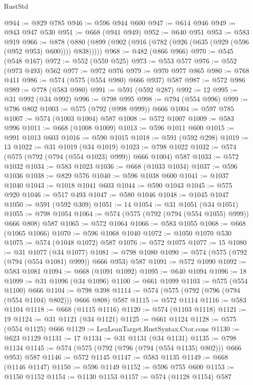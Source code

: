 \begin{lexlean}{RustStd}
\begin{coremodule}
@944 := @829 @785
@946 := @596 @944 @600
@947 := @614 @946
@949 := @943 @947 @530
@951 := @668 (@941 @949)
@952 := @640 @951
@953 := @583 @919
@966 := @878 (@880 (@899 (@902 (@916 (@782 (@926 (@635 (@929 (@596 (@952 @953) @600)))) @838)))))
@968 := @482 (@866 @966)
@970 := @545 (@548 @167)
@972 := @552 (@559 @525)
@973 := @553 @577
@976 := @552 (@973 @493) @562
@977 := @972 @976
@979 := @970 @977 @865
@980 := @768 @411
@986 := @574 (@575 (@554 @980) @666 @937) @587
@987 := @572 @986
@989 := @778 (@583 @980)
@991 := @591 (@592 @287)
@992 := 12
@995 := @31 @992 (@34 @992)
@996 := @798 @995
@998 := @794 (@554 @996)
@999 := @796 @802
@1003 := @575 (@792 (@998 @999)) @666
@1004 := @597 @785
@1007 := @574 (@1003 @1004) @587
@1008 := @572 @1007
@1009 := @583 @996
@1011 := @668 (@1008 @1009)
@1013 := @596 @1011 @600
@1015 := @991 @1013 @603
@1016 := @590 @1015
@1018 := @591 (@592 @298)
@1019 := 13
@1022 := @31 @1019 (@34 @1019)
@1023 := @798 @1022
@1032 := @574 (@575 (@792 (@794 (@554 @1023) @999)) @666 @1004) @587
@1033 := @572 @1032
@1034 := @583 @1023
@1036 := @668 (@1033 @1034)
@1037 := @596 @1036
@1038 := @829 @576
@1040 := @596 @1038 @600
@1041 := @1037 @1040
@1043 := @1018 @1041 @603
@1044 := @590 @1043
@1045 := @575 @920
@1046 := @517 @493
@1047 := @580 @1046
@1048 := @1045 @1047
@1050 := @591 (@592 @309)
@1051 := 14
@1054 := @31 @1051 (@34 @1051)
@1055 := @798 @1054
@1064 := @574 (@575 (@792 (@794 (@554 @1055) @999)) @666 @808) @587
@1065 := @572 @1064
@1066 := @583 @1055
@1068 := @668 (@1065 @1066)
@1070 := @596 @1068 @1040
@1072 := @1050 @1070 @530
@1075 := @574 (@1048 @1072) @587
@1076 := @572 @1075
@1077 := 15
@1080 := @31 @1077 (@34 @1077)
@1081 := @798 @1080
@1090 := @574 (@575 (@792 (@794 (@554 @1081) @999)) @666 @953) @587
@1091 := @572 @1090
@1092 := @583 @1081
@1094 := @668 (@1091 @1092)
@1095 := @640 @1094
@1096 := 18
@1099 := @31 @1096 (@34 @1096)
@1100 := @661 @1099
@1103 := @575 (@554 @1100) @666
@1104 := @798 @398
@1114 := @574 (@575 (@792 (@796 (@794 (@554 @1104) @802))) @666 @808) @587
@1115 := @572 @1114
@1116 := @583 @1104
@1118 := @668 (@1115 @1116)
@1120 := @574 (@1103 @1118)
@1121 := 19
@1124 := @31 @1121 (@34 @1121)
@1125 := @661 @1124
@1128 := @575 (@554 @1125) @666
@1129 := LexLeanTarget.RustSyntax.Ctor.cons
@1130 := @623 @1129
@1131 := 17
@1134 := @31 @1131 (@34 @1131)
@1135 := @798 @1134
@1145 := @574 (@575 (@792 (@796 (@794 (@554 @1135) @802))) @666 @953) @587
@1146 := @572 @1145
@1147 := @583 @1135
@1149 := @668 (@1146 @1147)
@1150 := @596 @1149
@1152 := @596 @755 @600
@1153 := @1150 @1152
@1154 := @1130 @1153
@1157 := @574 (@1128 @1154) @587

\end{coremodule}
\end{lexlean}
